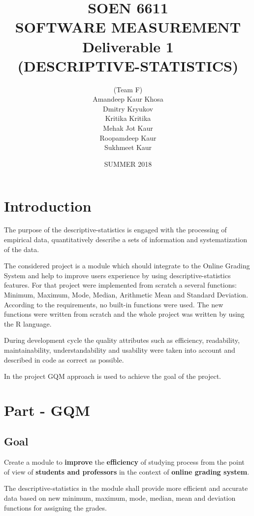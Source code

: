 \documentclass[12pt]{article}
\title{SOEN 6611 \\ SOFTWARE MEASUREMENT \\ Deliverable 1 \\
(DESCRIPTIVE-STATISTICS)}
\date{SUMMER 2018}
\author{(Team F)\\
Amandeep Kaur Khosa\\
Dmitry Kryukov\\
Kritika Kritika\\
Mehak Jot Kaur\\
Roopamdeep Kaur\\
Sukhmeet Kaur
}
\begin{document}
            
\maketitle               

\newpage
\tableofcontents
\section{Introduction}
The purpose of the descriptive-statistics is engaged with the processing of empirical data, quantitatively describe a sets of information and systematization of the data. 

The considered project is a module which should integrate to the Online Grading System and help to improve users experience by using descriptive-statistics features. For that project were implemented from scratch a several functions: Minimum, Maximum, Mode, Median, Arithmetic Mean and Standard Deviation. According to the requirements, no built-in functions were used. The new functions were written from scratch and the whole project was written by using the R language.

During development cycle the quality attributes such as efficiency, readability,  maintainability, understandability and usability were taken into account and described in code as correct as possible.

In the project GQM approach is used to achieve the goal of the project.\cite{GQM-approach} \cite{GQM} \cite{GQM-wiki} \cite{GQM-eduardo} \cite{GQM-book} \cite{GQM-book2} \cite{GQM-Bjorn}

\section{Part - GQM}      
\subsection{Goal}
Create a module to \textbf{improve} the \textbf{efficiency} of studying process from the point of view of \textbf{students and professors} in the context of \textbf{online grading system}. \par 
The descriptive-statistics in the module shall provide more efficient and accurate data based on new minimum, maximum, mode, median, mean and deviation functions for assigning the grades.
\end{document}
